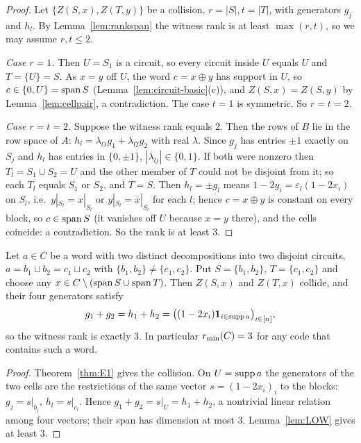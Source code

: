 \begin{proof}
Let $\{Z(S,x),Z(T,y)\}$ be a collision, $r=|S|,t=|T|$, with generators $g_j$ and $h_l$. By Lemma~\ref{lem:rankspan} the witness rank is at least $\max(r,t)$, so we may assume $r,t\le2$.

\emph{Case $r=1$.} Then $U=S_1$ is a circuit, so every circuit inside $U$ equals $U$ and $T=\{U\}=S$. As $x=y$ off $U$, the word $c=x\oplus y$ has support in $U$, so $c\in\{0,U\}=\operatorname{span} S$ (Lemma~\ref{lem:circuit-basic}(c)), and $Z(S,x)=Z(S,y)$ by Lemma~\ref{lem:cellpair}, a contradiction. The case $t=1$ is symmetric. So $r=t=2$.

\emph{Case $r=t=2$.} Suppose the witness rank equals $2$. Then the rows of $B$ lie in the row space of $A$: $h_l=\lambda_{l1}g_1+\lambda_{l2}g_2$ with real $\lambda$. Since $g_j$ has entries $\pm1$ exactly on $S_j$ and $h_l$ has entries in $\{0,\pm1\}$, $|\lambda_{lj}|\in\{0,1\}$. If both were nonzero then $T_l=S_1\cup S_2=U$ and the other member of $T$ could not be disjoint from it; so each $T_l$ equals $S_1$ or $S_2$, and $T=S$. Then $h_l=\pm g_l$ means $1-2y_i=\varepsilon_l(1-2x_i)$ on $S_l$, i.e.\ $y|_{S_l}=x|_{S_l}$ or $y|_{S_l}=\bar x|_{S_l}$ for each $l$; hence $c=x\oplus y$ is constant on every block, so $c\in\operatorname{span} S$ (it vanishes off $U$ because $x=y$ there), and the cells coincide: a contradiction. So the rank is at least $3$.
\end{proof}


\begin{theorem}\label{thm:L5}
Let $a\in C$ be a word with two distinct decompositions into two disjoint circuits, $a=b_1\sqcup b_2=c_1\sqcup c_2$ with $\{b_1,b_2\}\ne\{c_1,c_2\}$. Put $S=\{b_1,b_2\}$, $T=\{c_1,c_2\}$ and choose any $x\in C\setminus(\operatorname{span} S\cup\operatorname{span} T)$. Then $Z(S,x)$ and $Z(T,x)$ collide, and their four generators satisfy
\[
g_1+g_2=h_1+h_2=\bigl((1-2x_i)\mathbf 1_{i\in\operatorname{supp} a}\bigr)_{i\in[n]},
\]
so the witness rank is exactly $3$. In particular $r_{\min}(C)=3$ for any code that contains such a word.
\end{theorem}

\begin{proof}
Theorem~\ref{thm:E1} gives the collision. On $U=\operatorname{supp} a$ the generators of the two cells are the restrictions of the same vector $s=(1-2x_i)_i$ to the blocks: $g_j=s|_{b_j}$, $h_l=s|_{c_l}$. Hence $g_1+g_2=s|_U=h_1+h_2$, a nontrivial linear relation among four vectors; their span has dimension at most $3$. Lemma~\ref{lem:LOW} gives at least $3$.
\end{proof}

